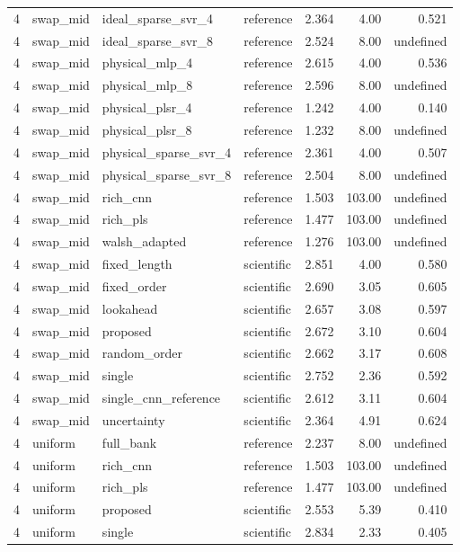 \documentclass[10pt,a4paper]{article}
\begin{document}
\begin{landscape}
\begin{longtable}{llllrrr}
4 & swap\_mid & ideal\_sparse\_svr\_4 & reference & 2.364 & 4.00 & 0.521 \\
4 & swap\_mid & ideal\_sparse\_svr\_8 & reference & 2.524 & 8.00 & undefined \\
4 & swap\_mid & physical\_mlp\_4 & reference & 2.615 & 4.00 & 0.536 \\
4 & swap\_mid & physical\_mlp\_8 & reference & 2.596 & 8.00 & undefined \\
4 & swap\_mid & physical\_plsr\_4 & reference & 1.242 & 4.00 & 0.140 \\
4 & swap\_mid & physical\_plsr\_8 & reference & 1.232 & 8.00 & undefined \\
4 & swap\_mid & physical\_sparse\_svr\_4 & reference & 2.361 & 4.00 & 0.507 \\
4 & swap\_mid & physical\_sparse\_svr\_8 & reference & 2.504 & 8.00 & undefined \\
4 & swap\_mid & rich\_cnn & reference & 1.503 & 103.00 & undefined \\
4 & swap\_mid & rich\_pls & reference & 1.477 & 103.00 & undefined \\
4 & swap\_mid & walsh\_adapted & reference & 1.276 & 103.00 & undefined \\
4 & swap\_mid & fixed\_length & scientific & 2.851 & 4.00 & 0.580 \\
4 & swap\_mid & fixed\_order & scientific & 2.690 & 3.05 & 0.605 \\
4 & swap\_mid & lookahead & scientific & 2.657 & 3.08 & 0.597 \\
4 & swap\_mid & proposed & scientific & 2.672 & 3.10 & 0.604 \\
4 & swap\_mid & random\_order & scientific & 2.662 & 3.17 & 0.608 \\
4 & swap\_mid & single & scientific & 2.752 & 2.36 & 0.592 \\
4 & swap\_mid & single\_cnn\_reference & scientific & 2.612 & 3.11 & 0.604 \\
4 & swap\_mid & uncertainty & scientific & 2.364 & 4.91 & 0.624 \\
4 & uniform & full\_bank & reference & 2.237 & 8.00 & undefined \\
4 & uniform & rich\_cnn & reference & 1.503 & 103.00 & undefined \\
4 & uniform & rich\_pls & reference & 1.477 & 103.00 & undefined \\
4 & uniform & proposed & scientific & 2.553 & 5.39 & 0.410 \\
4 & uniform & single & scientific & 2.834 & 2.33 & 0.405 \\

\end{longtable}
\end{landscape}
\end{document}
